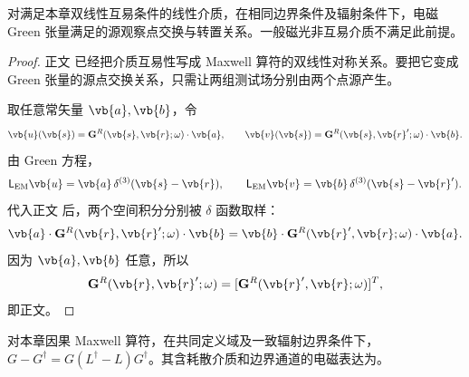 \begin{theorem}
对满足本章双线性互易条件的线性介质，在相同边界条件及辐射条件下，电磁 Green 张量满足的源观察点交换与转置关系。一般磁光非互易介质不满足此前提。
\end{theorem}

\begin{proof}
正文 已经把介质互易性写成 Maxwell 算符的双线性对称关系。要把它变成 Green 张量的源点交换关系，只需让两组测试场分别由两个点源产生。

取任意常矢量 \(\vb{a},\vb{b}\)，令
\begin{equation*}
\vb{u}(\vb{s})=\mathbf G^R(\vb{s},\vb{r};\omega)\cdot\vb{a},
\qquad
\vb{v}(\vb{s})=\mathbf G^R(\vb{s},\vb{r}';\omega)\cdot\vb{b}.
\end{equation*}
由 Green 方程，
\begin{equation*}
\mathsf L_{\rm EM}\vb{u}
=\vb{a}\,\delta^{(3)}(\vb{s}-\vb{r}),
\qquad
\mathsf L_{\rm EM}\vb{v}
=\vb{b}\,\delta^{(3)}(\vb{s}-\vb{r}').
\end{equation*}
代入正文 后，两个空间积分分别被 \(\delta\) 函数取样：
\begin{equation*}
\vb{a}\cdot\mathbf G^R(\vb{r},\vb{r}';\omega)\cdot\vb{b}
=\vb{b}\cdot\mathbf G^R(\vb{r}',\vb{r};\omega)\cdot\vb{a}.
\end{equation*}
因为 \(\vb{a},\vb{b}\) 任意，所以
\begin{equation*}
\mathbf G^R(\vb{r},\vb{r}';\omega)
=[\mathbf G^R(\vb{r}',\vb{r};\omega)]^T,
\end{equation*}
即正文。
\end{proof}

\begin{proposition}
对本章因果 Maxwell 算符，在共同定义域及一致辐射边界条件下，$G-G^\dagger=G(L^\dagger-L)G^\dagger$。其含耗散介质和边界通道的电磁表达为。
\end{proposition}

